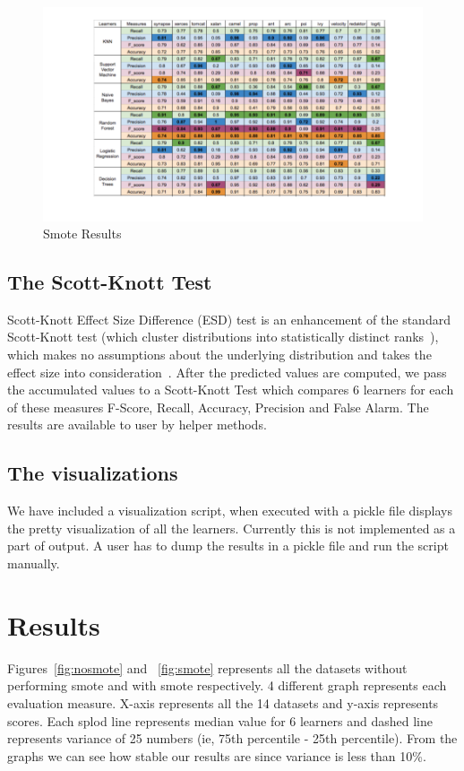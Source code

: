 \documentclass[conference]{IEEEtran}
\begin{document}
\begin{figure}[!htbp]
    \centering
    \includegraphics[scale=0.50]{smote.png}
        \caption{Smote Results}
    \label{fig:tablesmote}
\end{figure}

\subsection{\textbf{The Scott-Knott Test}}

Scott-Knott Effect Size Difference
(ESD) test is an enhancement of the standard Scott-Knott
test (which cluster distributions into statistically
distinct ranks~\cite{scott1974cluster}), which makes no assumptions about the underlying distribution and takes the effect size into
consideration~\cite{tantithamthavorn2015empirical}. After the predicted values are computed, we pass the accumulated values to a Scott-Knott Test which compares 6 learners for each of these measures F-Score, Recall, Accuracy, Precision and False Alarm. The results are available to user by helper methods.

\subsection{\textbf{The visualizations}}

We have included a visualization script, when executed with a pickle file displays the pretty visualization of all the learners. Currently this is not implemented as a part of output. A user has to dump the results in a pickle file and run the script manually.

\section{Results}
\label{results}
 Figures~\ref{fig:nosmote} and ~\ref{fig:smote} represents all the datasets without performing smote and with smote respectively. 4 different graph represents each evaluation measure. X-axis represents all the 14 datasets and y-axis represents scores. Each splod line represents median value for 6 learners and dashed line represents variance of 25 numbers (ie, 75th percentile - 25th percentile). From the graphs we can see how stable our results are since variance is less than 10\%.
 
\end{document}
